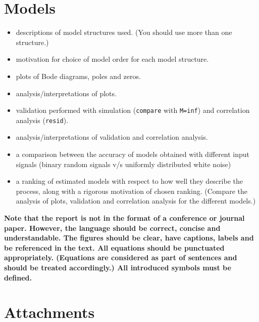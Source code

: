 \documentclass[10pt,a4paper]{article}
\begin{document}
\section{Models}
\begin{itemize}
    \item descriptions of model structures used. (You should use more than one structure.)
    \item motivation for choice of model order for each model structure.
    \item plots of Bode diagrams, poles and zeros.
    \item analysis/interpretations of plots.
   \item validation performed with simulation (\texttt{compare} with \texttt{M=inf}) and correlation analysis (\texttt{resid}).
   \item analysis/interpretations of validation and correlation analysis.
   \item a comparison between the accuracy of models obtained with different input signals (binary random signals v/s uniformly distributed white noise)
   \item  a ranking of estimated models with respect to how well they describe the process, along with a rigorous motivation of chosen ranking. (Compare the analysis of plots, validation and correlation analysis for the different models.)
\end{itemize}

\newpage
{\bf Note that the report is not in the format of a conference or journal paper. However, the language should be correct, concise and understandable. The figures should be clear, have captions, labels and be referenced in the text. All equations should be punctuated appropriately. (Equations are considered as part of sentences and should be treated accordingly.) All introduced symbols must be defined.}
\section*{Attachments}
	\label{matlabCode}
    
	
	
	
\end{document}
